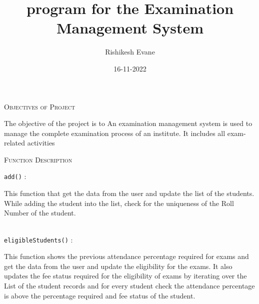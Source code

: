 \documentclass{report}
\author{Rishikesh Evane}
\title{program for the Examination Management System}
\date{16-11-2022}
\begin{document}
\maketitle

\begin{center}
	\textsc{\LARGE{Objectives of Project}} 
\end{center}

\hfill

The objective of the project is to An examination management system is used to manage the complete examination process of an institute. It includes all exam-related activities

\hfill

\begin{center}
	\textsc{\LARGE{Function Description}}
\end{center}

\begin{flushleft}
\texttt{add()}
\textsf{ : }
\end{flushleft}
\begin{flushright}
\hfill\begin{minipage}{0.85\linewidth}
	\textsf{		This function that get the data from the user and update the list of the students. While adding the student into the list, check for the uniqueness of the Roll Number of the student.} \\ \\
	
\end{minipage}
\end{flushright}

\begin{flushleft}
\texttt{eligibleStudents()}
\textsf{ : }
\end{flushleft}
\begin{flushright}
\hfill\begin{minipage}{0.85\linewidth}
	\textsf{		This function shows the previous attendance percentage required for exams and get the data from the user and update the eligibility for the exams. It also updates the fee status required for the eligibility of exams by iterating over the List of the student records and for every student check the attendance percentage is above the percentage required and fee status of the student. } \\ \\
	
\end{minipage}
\end{flushright}
\end{document}
